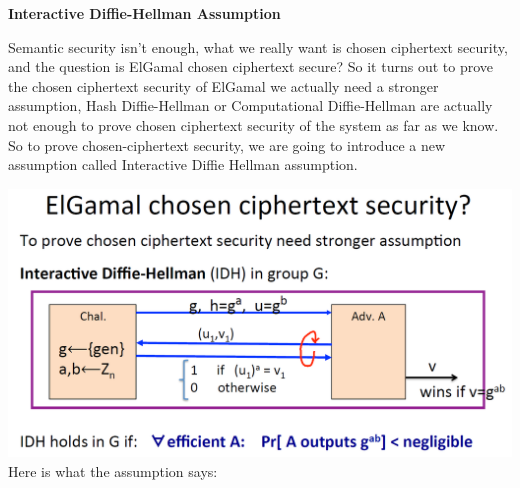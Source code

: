 \documentclass[11pt]{article}
\makeatletter
\def\maxwidth{\ifdim\Gin@nat@width>\linewidth\linewidth
    \else\Gin@nat@width\fi}
\let\Oldincludegraphics\includegraphics
\renewcommand{\includegraphics}[1]{\Oldincludegraphics[width=.8\maxwidth]{#1}}
\makeatother
\begin{document}
\textbf{Interactive Diffie-Hellman Assumption}

Semantic security isn't enough, what we really want is chosen ciphertext
security, and the question is ElGamal chosen ciphertext secure? So it
turns out to prove the chosen ciphertext security of ElGamal we actually
need a stronger assumption, Hash Diffie-Hellman or Computational
Diffie-Hellman are actually not enough to prove chosen ciphertext
security of the system as far as we know. So to prove chosen-ciphertext
security, we are going to introduce a new assumption called Interactive
Diffie Hellman assumption.

\includegraphics{./Images/InteractiveDHAssump.png} Here is what the
assumption says:
\end{document}
